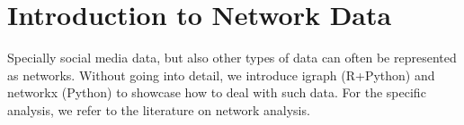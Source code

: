 \chapter{Introduction to Network Data}
\label{chap:neywork}

Specially social media data, but also other types of data can often be represented as networks. Without going into detail, we introduce igraph (R+Python) and networkx (Python) to showcase how to deal with such data. For the specific analysis, we refer to the literature on network analysis.




